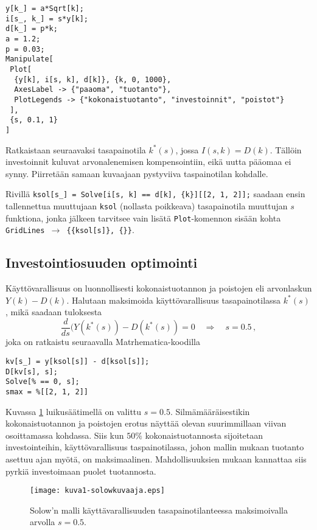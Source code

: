 \documentclass[a4paper,11pt]{article}
\begin{document}
{\begin{lstlisting}
y[k_] = a*Sqrt[k];
i[s_, k_] = s*y[k];
d[k_] = p*k;
a = 1.2;
p = 0.03;
Manipulate[
 Plot[
  {y[k], i[s, k], d[k]}, {k, 0, 1000}, 
  AxesLabel -> {"paaoma", "tuotanto"}, 
  PlotLegends -> {"kokonaistuotanto", "investoinnit", "poistot"}
 ],
 {s, 0.1, 1}
]
\end{lstlisting}

Ratkaistaan seuraavaksi tasapainotila $k^*(s)$, jossa $I(s,k)=D(k)$. Tällöin investoinnit kuluvat arvonalenemisen kompensointiin, eikä uutta pääomaa ei synny. Piirretään samaan kuvaajaan pystyviiva taspainotilan kohdalle.

Rivillä \texttt{ksol[s\_] = Solve[i[s, k] == d[k], \{k\}][[2, 1, 2]];} saadaan ensin tallennettua muuttujaan \texttt{ksol} (nollasta poikkeava) tasapainotila muuttujan $s$ funktiona, jonka jälkeen tarvitsee vain lisätä \texttt{Plot}-komennon sisään kohta \texttt{GridLines $\rightarrow$ \{\{ksol[s]\}, \{\}\}}.

\subsection{Investointiosuuden optimointi}

Käyttövarallisuus on luonnollisesti kokonaistuotannon ja poistojen eli arvonlaskun $Y(k)-D(k)$. Halutaan maksimoida käyttövarallisuus tasapainotilassa $k^*(s)$, mikä saadaan tuloksesta
\begin{equation}
    \frac{d}{ds} (Y(k^*(s))-D(k^*(s)) = 0 \quad \Rightarrow \quad s=0.5\,,
\end{equation}
joka on ratkaistu seuraavalla Matrhematica-koodilla
\begin{lstlisting}
kv[s_] = y[ksol[s]] - d[ksol[s]];
D[kv[s], s];
Solve[% == 0, s];
smax = %[[2, 1, 2]]
\end{lstlisting}

Kuvassa \ref{fig:solow} luikusäätimellä on valittu $s=0.5$. Silmämääräisestikin kokonaistuotannon ja poistojen erotus näyttää olevan suurimmillaan viivan osoittamassa kohdassa. Siis kun $50\%$ kokonaistuotannosta sijoitetaan investointeihin, käyttövarallisuus taspainotilassa, johon mallin mukaan tuotanto asettuu ajan myötä, on maksimaalinen. Mahdollisuuksien mukaan kannattaa siis pyrkiä investoimaan puolet tuotannosta.

\begin{figure}
    \centering
    \texttt{[image: kuva1-solowkuvaaja.eps]}
    \caption{Solow'n malli käyttävarallisuuden tasapainotilanteessa maksimoivalla arvolla $s=0.5$.}
    \label{fig:solow}
\end{figure}


}
\end{document}
